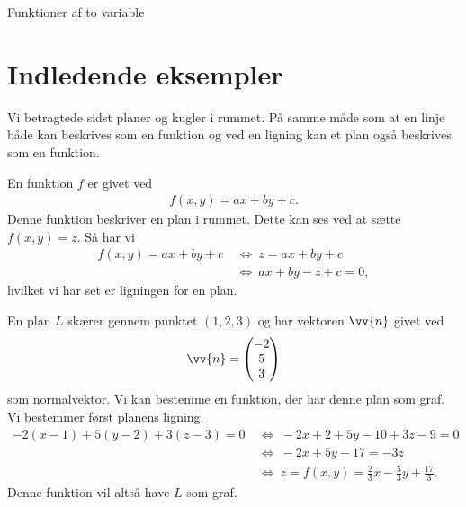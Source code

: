 
\begin{center}
\Huge
Funktioner af to variable
\end{center}

\section*{Indledende eksempler}

Vi betragtede sidst planer og kugler i rummet. På samme måde som at en linje både kan beskrives som en funktion og ved en ligning kan et plan også beskrives som en funktion. 
\begin{exa}
	En funktion $f$ er givet ved
	\begin{align*}
		f(x,y) = ax+by+c.
	\end{align*}
	Denne funktion beskriver en plan i rummet. Dette kan ses ved at sætte $f(x,y)=z$. Så har vi
	\begin{align*}
		f(x,y) = ax+by+c \ &\Leftrightarrow \ z = ax +by + c \\
		&\Leftrightarrow \ ax+by-z+c = 0,
	\end{align*}
	hvilket vi har set er ligningen for en plan. 
\end{exa}
\begin{exa}
	En plan $L$ skærer gennem punktet $(1,2,3)$ og har vektoren $\vv{n}$ givet ved
	\begin{align*}
		\vv{n} = 
		\begin{pmatrix}
			-2 \\ 5 \\ 3
		\end{pmatrix}
	\end{align*}
	som normalvektor. Vi kan bestemme en funktion, der har denne plan som graf. Vi bestemmer først planens ligning.
	\begin{align*}
		-2(x-1)+5(y-2)+3(z-3) = 0\ &\Leftrightarrow \ -2x+2+5y-10+3z-9 = 0 \\
								   &\Leftrightarrow	\  -2x+5y-17=-3z \\
								   &\Leftrightarrow	\ z= f(x,y) = \frac{2}{3}x-\frac{5}{3}y+\frac{17}{3}.
	\end{align*}
	Denne funktion vil altså have $L$ som graf.
\end{exa}

